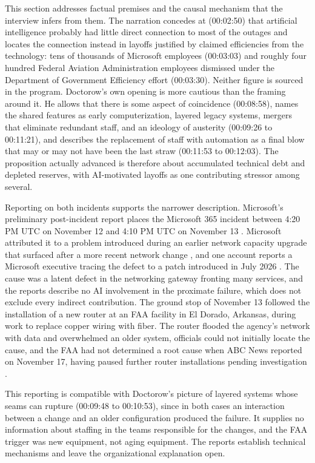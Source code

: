\documentclass[12pt]{article}
\newcommand{\ts}[1]{(#1)}
\begin{document}
This section addresses factual premises and the causal mechanism that the interview infers from them. The narration concedes at \ts{00:02:50} that artificial intelligence probably had little direct connection to most of the outages and locates the connection instead in layoffs justified by claimed efficiencies from the technology: tens of thousands of Microsoft employees \ts{00:03:03} and roughly four hundred Federal Aviation Administration employees dismissed under the Department of Government Efficiency effort \ts{00:03:30}. Neither figure is sourced in the program. Doctorow's own opening is more cautious than the framing around it. He allows that there is some aspect of coincidence \ts{00:08:58}, names the shared features as early computerization, layered legacy systems, mergers that eliminate redundant staff, and an ideology of austerity \ts{00:09:26 to 00:11:21}, and describes the replacement of staff with automation as a final blow that may or may not have been the last straw \ts{00:11:53 to 00:12:03}. The proposition actually advanced is therefore about accumulated technical debt and depleted reserves, with AI-motivated layoffs as one contributing stressor among several.

Reporting on both incidents supports the narrower description. Microsoft's preliminary post-incident report places the Microsoft 365 incident between 4:20 PM UTC on November 12 and 4:10 PM UTC on November 13 \cite{msreport}. Microsoft attributed it to a problem introduced during an earlier network capacity upgrade that surfaced after a more recent network change \cite{bleeping}, and one account reports a Microsoft executive tracing the defect to a patch introduced in July 2026 \cite{itpro}. The cause was a latent defect in the networking gateway fronting many services, and the reports describe no AI involvement in the proximate failure, which does not exclude every indirect contribution. The ground stop of November 13 followed the installation of a new router at an FAA facility in El Dorado, Arkansas, during work to replace copper wiring with fiber. The router flooded the agency's network with data and overwhelmed an older system, officials could not initially locate the cause, and the FAA had not determined a root cause when ABC News reported on November 17, having paused further router installations pending investigation \cite{aljazeera,abcfaa}.

This reporting is compatible with Doctorow's picture of layered systems whose seams can rupture \ts{00:09:48 to 00:10:53}, since in both cases an interaction between a change and an older configuration produced the failure. It supplies no information about staffing in the teams responsible for the changes, and the FAA trigger was new equipment, not aging equipment. The reports establish technical mechanisms and leave the organizational explanation open.
\end{document}
